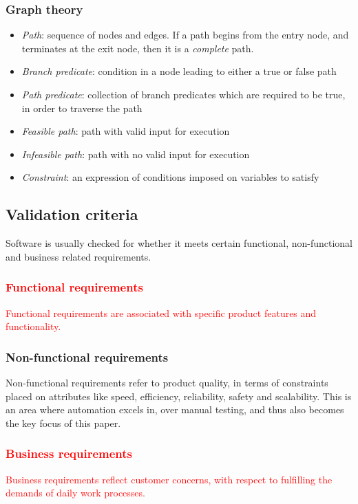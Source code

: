 \documentclass{icldt}
\numberwithin{equation}{section}       %
\begin{document}
\subsubsection{Graph theory}
\begin{itemize}
	\item \emph{Path}: sequence of nodes and edges. If a path begins from the entry node, and terminates at the exit node, then it is a \emph{complete} path.
	\item \emph{Branch predicate}: condition in a node leading to either a true or false path
	\item \emph{Path predicate}: collection of branch predicates which are required to be true, in order to traverse the path
	\item \emph{Feasible path}: path with valid input for execution
	\item \emph{Infeasible path}: path with no valid input for execution
	\item \emph{Constraint}: an expression of conditions imposed on variables to satisfy
\end{itemize}
\subsection{Validation criteria}
Software is usually checked for whether it meets certain functional, non-functional and business related requirements.
\textcolor{red}{
\subsubsection{Functional requirements}
Functional requirements are associated with specific product features and functionality.
}
\subsubsection{Non-functional requirements}
Non-functional requirements refer to product quality, in terms of constraints placed on attributes like speed, efficiency, reliability, safety and scalability. This is an area where automation excels in, over manual testing, and thus also becomes the key focus of this paper.
\textcolor{red}{
\subsubsection{Business requirements}
Business requirements reflect customer concerns, with respect to fulfilling the demands of daily work processes.
}
\end{document}
